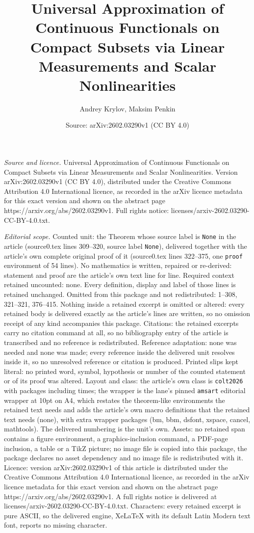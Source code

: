 \documentclass[10pt,a4paper]{amsart}
\title[Universal Approximation of Continuous Functionals on Compact]{Universal Approximation of Continuous Functionals on Compact Subsets via Linear Measurements and Scalar Nonlinearities}
\author{Andrey Krylov, Maksim Penkin}
\date{Source: arXiv:2602.03290v1 (CC BY 4.0)}
\begin{document}
\maketitle

\noindent\emph{Source and licence.} Universal Approximation of Continuous Functionals on Compact Subsets via Linear Measurements and Scalar Nonlinearities. Version arXiv:2602.03290v1 (CC BY 4.0), distributed under the Creative Commons Attribution 4.0 International licence, as recorded in the arXiv licence metadata for this exact version and shown on the abstract page https://arxiv.org/abs/2602.03290v1. Full rights notice: licenses/arxiv-2602.03290-CC-BY-4.0.txt.\par\smallskip

\noindent\textit{Editorial scope.} Counted unit: the Theorem whose source label is \texttt{None} in the article (source0.tex lines 309--320, source label \texttt{None}), delivered together with the article's own complete original proof of it (source0.tex lines 322--375, one \texttt{proof} environment of 54 lines). No mathematics is written, repaired or re-derived: statement and proof are the article's own text line for line. Required context retained uncounted: none. Every definition, display and label of those lines is retained unchanged. Omitted from this package and not redistributed: 1--308, 321--321, 376--415. Nothing inside a retained excerpt is omitted or altered: every retained body is delivered exactly as the article's lines are written, so no omission receipt of any kind accompanies this package. Citations: the retained excerpts carry no citation command at all, so no bibliography entry of the article is transcribed and no reference is redistributed. Reference adaptation: none was needed and none was made; every reference inside the delivered unit resolves inside it, so no unresolved reference or citation is produced. Printed slips kept literal: no printed word, symbol, hypothesis or number of the counted statement or of its proof was altered. Layout and class: the article's own class is \texttt{colt2026} with packages including times; the wrapper is the lane's pinned \texttt{amsart} editorial wrapper at 10pt on A4, which restates the theorem-like environments the retained text needs and adds the article's own macro definitions that the retained text needs (none), with extra wrapper packages (bm, bbm, dsfont, xspace, cancel, mathtools). The delivered numbering is the unit's own. Assets: no retained span contains a figure environment, a graphics-inclusion command, a PDF-page inclusion, a table or a TikZ picture; no image file is copied into this package, the package declares no asset dependency and no image file is redistributed with it. Licence: version arXiv:2602.03290v1 of this article is distributed under the Creative Commons Attribution 4.0 International licence, as recorded in the arXiv licence metadata for this exact version and shown on the abstract page https://arxiv.org/abs/2602.03290v1. A full rights notice is delivered at licenses/arxiv-2602.03290-CC-BY-4.0.txt. Characters: every retained excerpt is pure ASCII, so the delivered engine, XeLaTeX with its default Latin Modern text font, reports no missing character.
\end{document}
